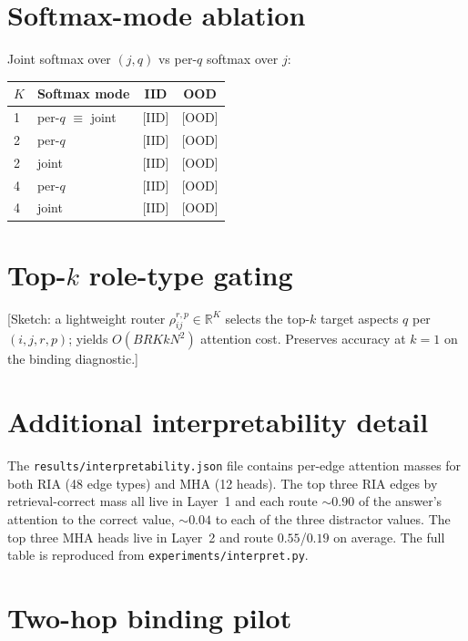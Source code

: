 \documentclass{article}
\newcommand{\R}{\mathbb{R}}
\begin{document}
\section{Softmax-mode ablation}
\label{app:softmax-ablation}

Joint softmax over $(j, q)$ vs per-$q$ softmax over $j$:

\begin{center}
\begin{tabular}{llcc}
\toprule
$K$ & Softmax mode & IID & OOD \\
\midrule
1 & per-$q$ $\equiv$ joint         & \textsc{[IID]} & \textsc{[OOD]} \\
2 & per-$q$                         & \textsc{[IID]} & \textsc{[OOD]} \\
2 & joint                           & \textsc{[IID]} & \textsc{[OOD]} \\
4 & per-$q$                         & \textsc{[IID]} & \textsc{[OOD]} \\
4 & joint                           & \textsc{[IID]} & \textsc{[OOD]} \\
\bottomrule
\end{tabular}
\end{center}

\section{Top-$k$ role-type gating}
\label{app:topk}

[Sketch: a lightweight router $\rho^{r,p}_{ij} \in \R^K$ selects the
top-$k$ target aspects $q$ per $(i, j, r, p)$; yields $O(B R K k N^2)$
attention cost. Preserves accuracy at $k{=}1$ on the binding
diagnostic.]

\section{Additional interpretability detail}
\label{app:interp}

The \texttt{results/interpretability.json} file contains per-edge
attention masses for both RIA (48 edge types) and MHA (12 heads). The
top three RIA edges by retrieval-correct mass all live in Layer~1 and
each route ${\sim}0.90$ of the answer's attention to the correct
value, ${\sim}0.04$ to each of the three distractor values. The top
three MHA heads live in Layer~2 and route $0.55$/$0.19$ on average.
The full table is reproduced from
\texttt{experiments/interpret.py}.

\section{Two-hop binding pilot}
\label{app:multihop}
\end{document}
